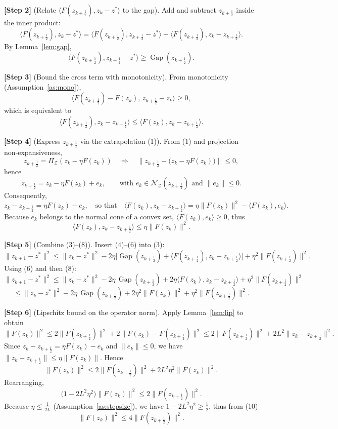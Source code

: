\documentclass{article}
\newcommand{\gap}{\operatorname{Gap}}
\begin{document}
\bigskip
\noindent\textbf{[Step 2]} (Relate $\langle F(z_{k+\frac12}),z_{k}-z^{*}\rangle$ to the gap).  
Add and subtract $z_{k+\frac12}$ inside the inner product:
\[
\langle F(z_{k+\frac12}),z_{k}-z^{*}\rangle
= \langle F(z_{k+\frac12}),z_{k+\frac12}-z^{*}\rangle
+ \langle F(z_{k+\frac12}),z_{k}-z_{k+\frac12}\rangle .
\tag{4}
\]
By Lemma~\ref{lem:gap},
\[
\langle F(z_{k+\frac12}),z_{k+\frac12}-z^{*}\rangle\ge \gap(z_{k+\frac12}).
\tag{5}
\]

\bigskip
\noindent\textbf{[Step 3]} (Bound the cross term with monotonicity).  
From monotonicity (Assumption~\ref{as:mono}),
\[
\langle F(z_{k+\frac12})-F(z_{k}),\,z_{k+\frac12}-z_{k}\rangle\ge0,
\]
which is equivalent to
\[
\langle F(z_{k+\frac12}),z_{k}-z_{k+\frac12}\rangle
\le \langle F(z_{k}),z_{k}-z_{k+\frac12}\rangle .
\tag{6}
\]

\bigskip
\noindent\textbf{[Step 4]} (Express $z_{k+\frac12}$ via the extrapolation (1)).  
From (1) and projection non‑expansiveness,
\[
z_{k+\frac12}= \Pi_{\mathcal Z}(z_{k}-\eta F(z_{k}))
\quad\Rightarrow\quad
\|z_{k+\frac12}-\bigl(z_{k}-\eta F(z_{k})\bigr)\|\le0,
\]
hence
\[
z_{k+\frac12}=z_{k}-\eta F(z_{k})+e_{k},
\qquad\text{with }e_{k}\in\mathcal N_{\mathcal Z}(z_{k+\frac12})\text{ and }\|e_{k}\|\le0.
\]
Consequently,
\[
z_{k}-z_{k+\frac12}= \eta F(z_{k})-e_{k},
\quad\text{so that}\quad
\langle F(z_{k}),z_{k}-z_{k+\frac12}\rangle
= \eta\|F(z_{k})\|^{2}-\langle F(z_{k}),e_{k}\rangle .
\tag{7}
\]
Because $e_{k}$ belongs to the normal cone of a convex set, $\langle F(z_{k}),e_{k}\rangle\ge0$, thus
\[
\langle F(z_{k}),z_{k}-z_{k+\frac12}\rangle\le \eta\|F(z_{k})\|^{2}.
\tag{8}
\]

\bigskip
\noindent\textbf{[Step 5]} (Combine (3)–(8)).  
Insert (4)–(6) into (3):
\[
\|z_{k+1}-z^{*}\|^{2}
\le\|z_{k}-z^{*}\|^{2}
-2\eta\bigl[\gap(z_{k+\frac12})+\langle F(z_{k+\frac12}),z_{k}-z_{k+\frac12}\rangle\bigr]
+\eta^{2}\|F(z_{k+\frac12})\|^{2}.
\]
Using (6) and then (8):
\[
\|z_{k+1}-z^{*}\|^{2}
\le\|z_{k}-z^{*}\|^{2}
-2\eta\,\gap(z_{k+\frac12})
+2\eta\langle F(z_{k}),z_{k}-z_{k+\frac12}\rangle
+\eta^{2}\|F(z_{k+\frac12})\|^{2}
\]
\[
\le\|z_{k}-z^{*}\|^{2}
-2\eta\,\gap(z_{k+\frac12})
+2\eta^{2}\|F(z_{k})\|^{2}
+\eta^{2}\|F(z_{k+\frac12})\|^{2}.
\tag{9}
\]

\bigskip
\noindent\textbf{[Step 6]} (Lipschitz bound on the operator norm).  
Apply Lemma~\ref{lem:lip} to obtain
\[
\|F(z_{k})\|^{2}
\le 2\|F(z_{k+\frac12})\|^{2}+2\|F(z_{k})-F(z_{k+\frac12})\|^{2}
\le 2\|F(z_{k+\frac12})\|^{2}+2L^{2}\|z_{k}-z_{k+\frac12}\|^{2}.
\]
Since $z_{k}-z_{k+\frac12}= \eta F(z_{k})-e_{k}$ and $\|e_{k}\|\le0$, we have $\|z_{k}-z_{k+\frac12}\|\le\eta\|F(z_{k})\|$.  Hence
\[
\|F(z_{k})\|^{2}\le 2\|F(z_{k+\frac12})\|^{2}+2L^{2}\eta^{2}\|F(z_{k})\|^{2}.
\]
Rearranging,
\[
\bigl(1-2L^{2}\eta^{2}\bigr)\|F(z_{k})\|^{2}\le 2\|F(z_{k+\frac12})\|^{2}.
\tag{10}
\]
Because $\eta\le\frac{1}{2L}$ (Assumption~\ref{as:stepsize}), we have $1-2L^{2}\eta^{2}\ge\frac12$, thus from (10)
\[
\|F(z_{k})\|^{2}\le 4\|F(z_{k+\frac12})\|^{2}.
\tag{11}
\]
\end{document}
